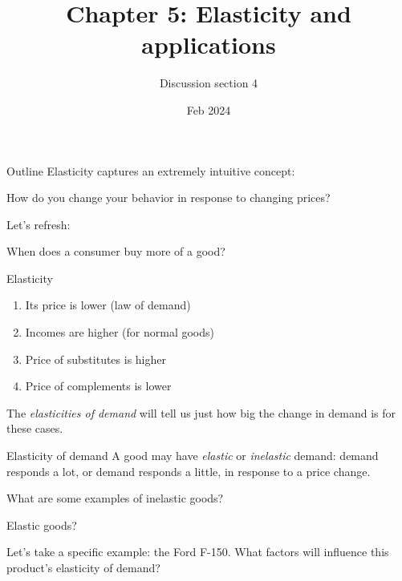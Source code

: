 \documentclass[aspectratio=169]{beamer}
\title{Chapter 5: Elasticity and applications}
\author{Discussion section 4}
\date{Feb 2024}
\begin{document}
\begin{frame}
    \titlepage 
\end{frame}

\begin{frame}{Outline}
    Elasticity captures an extremely intuitive concept: 
    
    \begin{center}
        How do you change your behavior in response to changing prices?
    \end{center}

    \medskip

    Let's refresh:

    \begin{center}
        When does a consumer buy more of a good?
    \end{center}

\end{frame}

\begin{frame}{Elasticity}
    \begin{enumerate}
        \item Its price is lower (law of demand)
        \item Incomes are higher (for normal goods)
        \item Price of substitutes is higher
        \item Price of complements is lower
    \end{enumerate}

    \medskip

    The \textit{elasticities of demand} will tell us just how big the change in demand is for these cases.
\end{frame}

\begin{frame}{Elasticity of demand}
    A good may have \textit{elastic} or \textit{inelastic} demand: demand responds a lot, or demand responds a little, in response to a price change.

    \medskip

    What are some examples of inelastic goods? 
    
    \medskip

    Elastic goods?

    \medskip

    \medskip

    Let's take a specific example: the Ford F-150. What factors will influence this product's elasticity of demand?
\end{frame}
\end{document}
